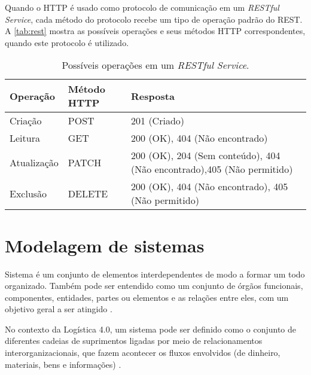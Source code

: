 	Quando o HTTP é usado como protocolo de comunicação em um \textit{RESTful Service}, cada método do protocolo recebe um tipo de operação padrão do REST. A \autoref{tab:rest} mostra as possíveis operações e seus métodos HTTP correspondentes, quando este protocolo é utilizado.
	

	\begin{table}[htb]
		\centering
		\footnotesize
		\caption{Possíveis operações em um \textit{RESTful Service}.}
		\label{tab:rest}
		\begin{tabular}{p{2cm}p{2cm}p{8cm}}
			\hline
			\textbf{Operação} &
			\textbf{Método \newline HTTP} &
			\textbf{Resposta} \\[5mm]

			\hline
			Criação &
			POST &
			201 (Criado) \\[5mm]
			
			\hline
			Leitura &
			GET &
			200 (OK), 404 (Não encontrado)  \\[5mm]
			
			\hline
			Atualização &
			PATCH &
			200 (OK), 204 (Sem conteúdo), 404 (Não encontrado),405 (Não permitido) \\[5mm]
			
			
			\hline
			Exclusão &
			DELETE &
			200 (OK), 404 (Não encontrado), 405 (Não permitido) \\[5mm]
			
			\hline
		\end{tabular}
	\end{table}

\section{Modelagem de sistemas}
\label{sec:modelagem}

	Sistema é um conjunto de elementos interdependentes de modo a formar um todo organizado. Também pode ser entendido como um conjunto de órgãos funcionais, componentes, entidades, partes ou elementos e as relações entre eles, com um objetivo geral a ser atingido \cite{mulbert2005sistemas}.
	
	No contexto da Logística 4.0, um sistema pode ser definido como o conjunto de diferentes cadeias de suprimentos ligadas por meio de relacionamentos interorganizacionais, que fazem acontecer os fluxos envolvidos (de dinheiro, materiais, bens e informações) \cite{oliveira2016supplychain}.
	

